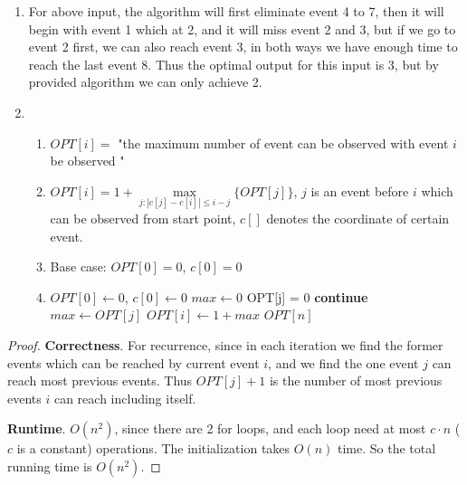 \documentclass[paper=a4, fontsize=11pt]{scrartcl} %
\numberwithin{equation}{section} %
\numberwithin{figure}{section} %
\numberwithin{table}{section} %
\newenvironment{myproof}{\begin{proof}\setlength{\parindent}{2em}}{\end{proof}}
\begin{document}
\begin{enumerate}
\begin{enumerate}
\item
For above input, the algorithm will first eliminate event 4 to 7, then it will begin with event 1 which at 2, and it will miss event 2 and 3, but if we go to event 2 first, we can also reach event 3,  in both ways we have enough time to reach the last event 8. Thus the optimal output for this input is 3, but by provided algorithm we can only achieve 2.
\item
\begin{enumerate}
\item
$OPT[i]=$ "the maximum number of event can be observed with event $i$ be observed "
\item
$OPT[i] =  1+\max\limits_{j:|c[j]-c[i]|\leq i-j} \{ OPT[j]\}$, $j$ is an event before $i$ which can be observed from start point, $c[]$ denotes the coordinate of certain event. 
\item
Base case: $OPT[0] = 0$, $c[0] = 0$
\item
\begin{algorithmic}
\STATE $OPT[0] \leftarrow 0$, $c[0]\leftarrow 0$
	\STATE $max \leftarrow 0$
		\STATE OPT[j] = 0
		\STATE \textbf{continue}
	\ENDIF
				\STATE $max \leftarrow OPT[j]$
			\ENDIF
		\ENDIF
	\ENDFOR
	\STATE $OPT[i] \leftarrow 1 + max$
\ENDFOR
\RETURN $OPT[n]$
\end{algorithmic}
\end{enumerate}
\end{enumerate}
\begin{myproof}
\textbf{Correctness}.
For recurrence, since in each iteration we find the former events which can be reached by current event $i$, and we find the one event $j$ can reach most previous events. Thus $OPT[j] + 1$ is the number of most previous events $i$ can reach including itself. 

\textbf{Runtime}. $O(n^2)$, since there are 2 for loops, and each loop need at most $c\cdot n$ ($c$ is a constant) operations. The initialization takes $O(n)$ time. So the total running time is $O(n^2)$.
\end{myproof} 

\end{enumerate}
\end{document}
